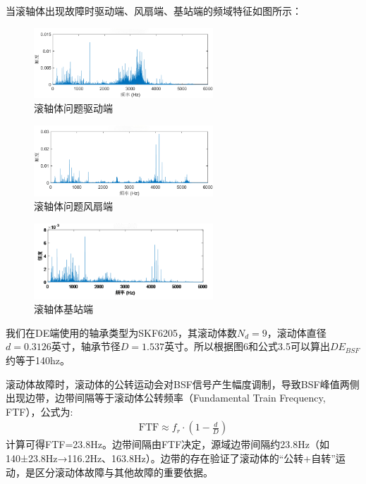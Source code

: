 \documentclass[a4paper]{CPIPC}
\numberwithin{equation}{section}
\begin{document}
当滚轴体出现故障时驱动端、风扇端、基站端的频域特征如图所示：
\begin{figure}[H]
  \centering
  \includegraphics[width=0.6\textwidth]{滚轴体问题驱动端.png}
  \caption{滚轴体问题驱动端}
  \label{fig:confidence}
\end{figure}
\begin{figure}[H]
  \centering
  \includegraphics[width=0.6\textwidth]{滚轴体问题风扇端.png}
  \caption{滚轴体问题风扇端}
  \label{fig:confidence}
\end{figure}
\begin{figure}[H]
  \centering
  \includegraphics[width=0.6\textwidth]{滚轴体基站端.png}
  \caption{滚轴体基站端}
  \label{fig:confidence}
\end{figure}


我们在DE端使用的轴承类型为SKF6205，其滚动体数${N_d=9}$，滚动体直径${d=0.3126英寸}$，轴承节径${D=1.537英寸}$。所以根据图6和公式3.5可以算出$DE_{BSF}$约等于140hz。

滚动体故障时，滚动体的公转运动会对BSF信号产生幅度调制，导致BSF峰值两侧出现边带，边带间隔等于滚动体公转频率（Fundamental Train Frequency, FTF），公式为:
\begin{align}
   \text{FTF} \approx f_r \cdot \left(1 - \frac{d}{D}\right)
\end{align}
计算可得FTF=23.8Hz。边带间隔由FTF决定，源域边带间隔约23.8Hz（如140±23.8Hz→116.2Hz、163.8Hz）。边带的存在验证了滚动体的“公转+自转”运动，是区分滚动体故障与其他故障的重要依据。
\end{document}
